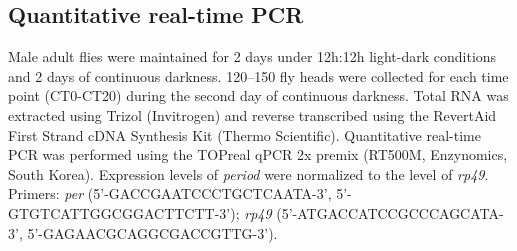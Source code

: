 \subsection*{Quantitative real-time PCR}

Male adult flies were maintained for 2 days under 12h:12h light-dark conditions and 2 days of continuous darkness.
120--150 fly heads were collected for each time point (CT0-CT20) during the second day of continuous darkness.
Total RNA was extracted using Trizol (Invitrogen) and reverse transcribed using the RevertAid First Strand cDNA Synthesis Kit (Thermo Scientific).
Quantitative real-time PCR was performed using the TOPreal qPCR 2x premix (RT500M, Enzynomics, South Korea).
Expression levels of \emph{period} were normalized to the level of \emph{rp49}.
Primers: \emph{per} (5'-GACCGAATCCCTGCTCAATA-3', 5'-GTGTCATTGGCGGACTTCTT-3'); \emph{rp49} (5'-ATGACCATCCGCCCAGCATA-3', 5'-GAGAACGCAGGCGACCGTTG-3').
  